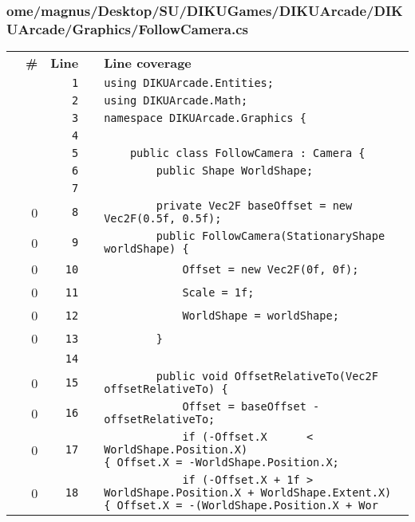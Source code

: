 \documentclass[a4paper,landscape,10pt]{article}
\begin{document}
\subsubsection{ome/magnus/Desktop/SU/DIKUGames/DIKUArcade/DIKUArcade/Graphics/FollowCamera.cs}
\begin{longtable}[l]{lrrll}
\textbf{} & \textbf{\#} & \textbf{Line} & \textbf{} & \textbf{Line coverage}\\
\cellcolor{gray} &  & \verb~1~ & & \verb~using DIKUArcade.Entities;~\\
\cellcolor{gray} &  & \verb~2~ & & \verb~using DIKUArcade.Math;~\\
\cellcolor{gray} &  & \verb~3~ & & \verb~namespace DIKUArcade.Graphics {~\\
\cellcolor{gray} &  & \verb~4~ & & \verb~~\\
\cellcolor{gray} &  & \verb~5~ & & \verb~    public class FollowCamera : Camera {~\\
\cellcolor{gray} &  & \verb~6~ & & \verb~        public Shape WorldShape;~\\
\cellcolor{gray} &  & \verb~7~ & & \verb~~\\
\cellcolor{red} & 0 & \verb~8~ & & \verb~        private Vec2F baseOffset = new Vec2F(0.5f, 0.5f);~\\
\cellcolor{red} & 0 & \verb~9~ & & \verb~        public FollowCamera(StationaryShape worldShape) {~\\
\cellcolor{red} & 0 & \verb~10~ & & \verb~            Offset = new Vec2F(0f, 0f);~\\
\cellcolor{red} & 0 & \verb~11~ & & \verb~            Scale = 1f;~\\
\cellcolor{red} & 0 & \verb~12~ & & \verb~            WorldShape = worldShape;~\\
\cellcolor{red} & 0 & \verb~13~ & & \verb~        }~\\
\cellcolor{gray} &  & \verb~14~ & & \verb~~\\
\cellcolor{red} & 0 & \verb~15~ & & \verb~        public void OffsetRelativeTo(Vec2F offsetRelativeTo) {~\\
\cellcolor{red} & 0 & \verb~16~ & & \verb~            Offset = baseOffset - offsetRelativeTo;~\\
\cellcolor{red} & 0 & \verb~17~ & & \verb~            if (-Offset.X      < WorldShape.Position.X)                            { Offset.X = -WorldShape.Position.X; ~\\
\cellcolor{red} & 0 & \verb~18~ & & \verb~            if (-Offset.X + 1f > WorldShape.Position.X + WorldShape.Extent.X) { Offset.X = -(WorldShape.Position.X + Wor~\\

\end{longtable}
\end{document}
